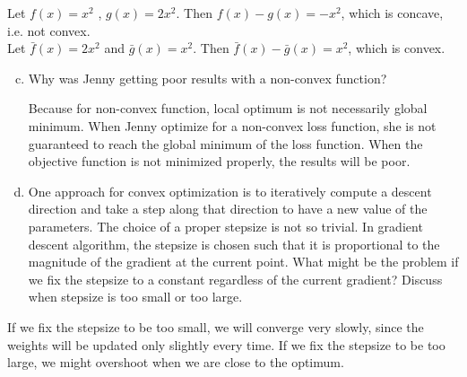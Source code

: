 \documentclass[11pt]{article}
\begin{document}
Let $f(x) = x^2$ , $g(x) = 2 x^2$. Then $f(x) - g(x) = -x^2$, which is concave, i.e. not convex.\\

Let $\bar{f}(x) = 2 x^2$ and $\bar{g}(x) = x^2$. Then $\bar{f}(x) - \bar{g}(x) = x^2$, which is convex.\\

\begin{enumerate}[(a)]
\setcounter{enumi}{2}
\item Why was Jenny getting poor results with a non-convex function?

Because for non-convex function, local optimum is not necessarily global minimum. When Jenny optimize for a non-convex loss function, she is not guaranteed to reach the global minimum of the loss function. When the objective function is not minimized properly, the results will be poor.

\item One approach for convex optimization is to iteratively compute a descent direction and take a step along that direction to have a new value of the parameters. The choice of a proper stepsize is not so trivial. In gradient descent algorithm, the stepsize is chosen such that it is proportional to the magnitude of the gradient at the current point. What might be the problem if we fix the stepsize to a constant regardless of the current gradient? Discuss when stepsize is too small or too large.
\end{enumerate}

If we fix the stepsize to be too small, we will converge very slowly, since the weights will be updated only slightly every time. If we fix the stepsize to be too large, we might overshoot when we are close to the optimum.  
\end{document}
